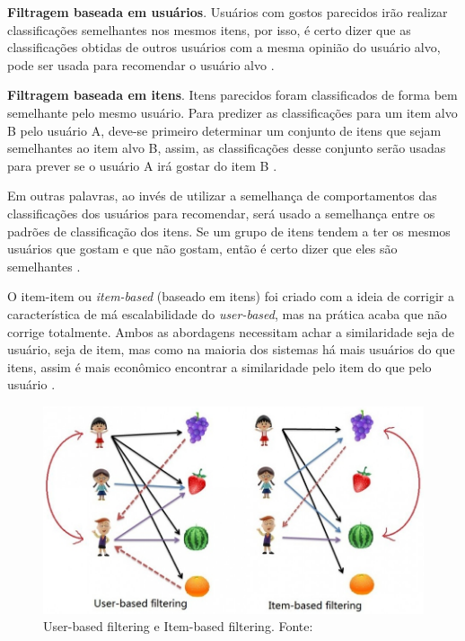 
\textbf{Filtragem baseada em usuários}. Usuários com gostos parecidos irão realizar classificações semelhantes nos mesmos itens, por isso, é certo dizer que as classificações obtidas de outros usuários com a mesma opinião do usuário alvo, pode ser usada para recomendar o usuário alvo \cite{Cimini:2019}.


\textbf{Filtragem baseada em itens}. Itens parecidos foram classificados de forma bem semelhante pelo mesmo usuário. Para predizer as classificações para um item alvo B pelo usuário A, deve-se primeiro determinar um conjunto de itens que sejam semelhantes ao item alvo B, assim, as classificações desse conjunto serão usadas para prever se o usuário A irá gostar do item B \cite{Cimini:2019}.

Em outras palavras, ao invés de utilizar a semelhança de comportamentos das classificações dos usuários para recomendar, será usado a semelhança entre os padrões de classificação dos itens. Se um grupo de itens tendem a ter os mesmos usuários que gostam e que não gostam, então é certo dizer que eles são semelhantes \cite{Ekstrand:2011:CFR:2185827.2185828}.

O item-item ou \textit{item-based} (baseado em itens) foi criado com a ideia de corrigir a característica de má escalabilidade do \textit{user-based}, mas na prática acaba que não corrige totalmente. Ambos as abordagens necessitam achar a similaridade seja de usuário, seja de item, mas como na maioria dos sistemas há mais usuários do que itens, assim é mais econômico encontrar a similaridade pelo item do que pelo usuário \cite{Ekstrand:2011:CFR:2185827.2185828}.

\begin{figure}[H]
    \centering
    \includegraphics[scale=0.4]{figuras/referencial_teorico/user_based_item_based.jpg}
    \caption[User-based filtering e Item-based filtering]{User-based filtering e Item-based filtering. Fonte: \cite{Pinela:2017}}
    \label{fig:user_based_item_based}
\end{figure}

